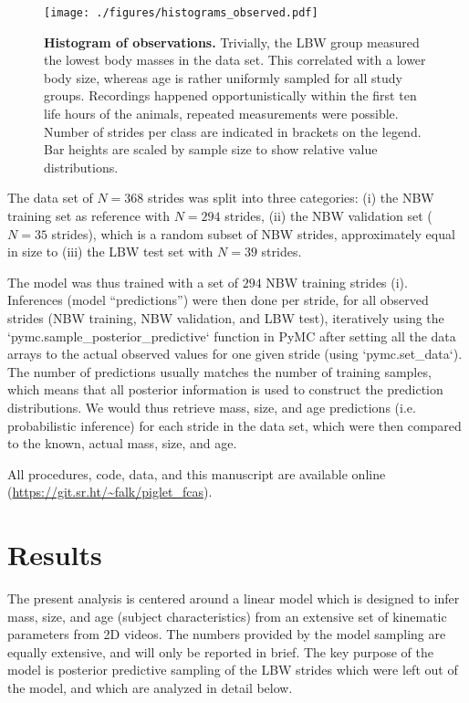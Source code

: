 \begin{figure}[p]
\centering
\texttt{[image: ./figures/histograms\_observed.pdf]}
\caption{\label{fig:observations}\textbf{Histogram of observations.} Trivially, the LBW group measured the lowest body masses in the data set. This correlated with a lower body size, whereas age is rather uniformly sampled for all study groups. Recordings happened opportunistically within the first ten life hours of the animals, repeated measurements were possible. Number of strides per class are indicated in brackets on the legend. Bar heights are scaled by sample size to show relative value distributions.}
\end{figure}


The data set of \(N = 368\) strides was split into three categories:
(i) the NBW training set as reference with \(N = 294\) strides,
(ii) the NBW validation set (\(N = 35\) strides), which is a random subset of NBW strides, approximately equal in size to
(iii) the LBW test set with \(N = 39\) strides.

The model was thus trained with a set of \(294\) NBW training strides (i).
Inferences (model ``predictions'') were then done per stride, for all observed strides (NBW training, NBW validation, and LBW test), iteratively using the `pymc.sample\_posterior\_predictive` function in PyMC after setting all the data arrays to the actual observed values for one given stride (using `pymc.set\_data`).
The number of predictions usually matches the number of training samples, which means that all posterior information is used to construct the prediction distributions.
We would thus retrieve mass, size, and age predictions (i.e. probabilistic inference) for each stride in the data set, which were then compared to the known, actual mass, size, and age.


All procedures, code, data, and this manuscript are available online \newline (\url{https://git.sr.ht/\~falk/piglet\_fcas}).

\FloatBarrier
\clearpage
\section{Results}
\label{results_22}
The present analysis is centered around a linear model which is designed to infer mass, size, and age (subject characteristics) from an extensive set of kinematic parameters from 2D videos.
The numbers provided by the model sampling are equally extensive, and will only be reported in brief.
The key purpose of the model is posterior predictive sampling of the LBW strides which were left out of the model, and which are analyzed in detail below.


